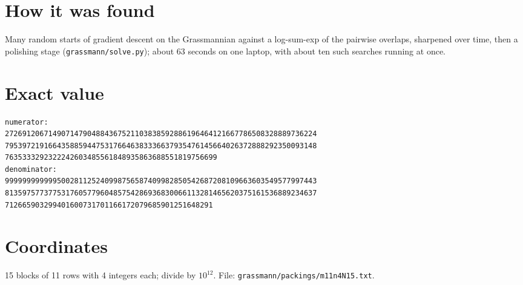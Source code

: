 \documentclass[11pt,a4paper]{article}
\begin{document}
\section{How it was found}
Many random starts of gradient descent on the Grassmannian against a log-sum-exp of the pairwise overlaps, sharpened over time, then a polishing stage (\texttt{grassmann/solve.py}); about 63 seconds on one laptop, with about ten such searches running at once.


\appendix
\section{Exact value}
{\small
\begin{verbatim}
numerator:
272691206714907147904884367521103838592886196464121667786508328889736224
795397219166435885944753176646383336637935476145664026372888292350093148
7635333292322242603485561848935863688551819756699
denominator:
999999999999500281125240998756587409982850542687208109663603549577997443
813597577377531760577960485754286936830066113281465620375161536889234637
712665903299401600731701166172079685901251648291
\end{verbatim}}

\section{Coordinates}
15 blocks of 11 rows with 4 integers each; divide by $10^{12}$. File: \texttt{grassmann/packings/m11n4N15.txt}.
{\tiny
\begin{multicols}{3}
\end{multicols}}
\end{document}
